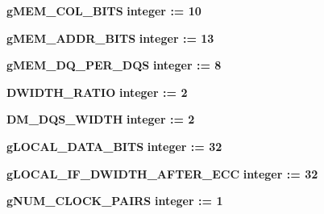 \begin{DoxyCompactItemize}
\item 
{\bf g\+M\+E\+M\+\_\+\+C\+O\+L\+\_\+\+B\+I\+TS} {\bfseries {\bfseries \textcolor{comment}{integer}\textcolor{vhdlchar}{ }\textcolor{vhdlchar}{ }\textcolor{vhdlchar}{\+:}\textcolor{vhdlchar}{=}\textcolor{vhdlchar}{ }\textcolor{vhdlchar}{ } \textcolor{vhdldigit}{10} \textcolor{vhdlchar}{ }}} 
\item 
{\bf g\+M\+E\+M\+\_\+\+A\+D\+D\+R\+\_\+\+B\+I\+TS} {\bfseries {\bfseries \textcolor{comment}{integer}\textcolor{vhdlchar}{ }\textcolor{vhdlchar}{ }\textcolor{vhdlchar}{\+:}\textcolor{vhdlchar}{=}\textcolor{vhdlchar}{ }\textcolor{vhdlchar}{ } \textcolor{vhdldigit}{13} \textcolor{vhdlchar}{ }}} 
\item 
{\bf g\+M\+E\+M\+\_\+\+D\+Q\+\_\+\+P\+E\+R\+\_\+\+D\+QS} {\bfseries {\bfseries \textcolor{comment}{integer}\textcolor{vhdlchar}{ }\textcolor{vhdlchar}{ }\textcolor{vhdlchar}{\+:}\textcolor{vhdlchar}{=}\textcolor{vhdlchar}{ }\textcolor{vhdlchar}{ } \textcolor{vhdldigit}{8} \textcolor{vhdlchar}{ }}} 
\item 
{\bf D\+W\+I\+D\+T\+H\+\_\+\+R\+A\+T\+IO} {\bfseries {\bfseries \textcolor{comment}{integer}\textcolor{vhdlchar}{ }\textcolor{vhdlchar}{ }\textcolor{vhdlchar}{\+:}\textcolor{vhdlchar}{=}\textcolor{vhdlchar}{ }\textcolor{vhdlchar}{ } \textcolor{vhdldigit}{2} \textcolor{vhdlchar}{ }}} 
\item 
{\bf D\+M\+\_\+\+D\+Q\+S\+\_\+\+W\+I\+D\+TH} {\bfseries {\bfseries \textcolor{comment}{integer}\textcolor{vhdlchar}{ }\textcolor{vhdlchar}{ }\textcolor{vhdlchar}{\+:}\textcolor{vhdlchar}{=}\textcolor{vhdlchar}{ }\textcolor{vhdlchar}{ } \textcolor{vhdldigit}{2} \textcolor{vhdlchar}{ }}} 
\item 
{\bf g\+L\+O\+C\+A\+L\+\_\+\+D\+A\+T\+A\+\_\+\+B\+I\+TS} {\bfseries {\bfseries \textcolor{comment}{integer}\textcolor{vhdlchar}{ }\textcolor{vhdlchar}{ }\textcolor{vhdlchar}{\+:}\textcolor{vhdlchar}{=}\textcolor{vhdlchar}{ }\textcolor{vhdlchar}{ } \textcolor{vhdldigit}{32} \textcolor{vhdlchar}{ }}} 
\item 
{\bf g\+L\+O\+C\+A\+L\+\_\+\+I\+F\+\_\+\+D\+W\+I\+D\+T\+H\+\_\+\+A\+F\+T\+E\+R\+\_\+\+E\+CC} {\bfseries {\bfseries \textcolor{comment}{integer}\textcolor{vhdlchar}{ }\textcolor{vhdlchar}{ }\textcolor{vhdlchar}{\+:}\textcolor{vhdlchar}{=}\textcolor{vhdlchar}{ }\textcolor{vhdlchar}{ } \textcolor{vhdldigit}{32} \textcolor{vhdlchar}{ }}} 
\item 
{\bf g\+N\+U\+M\+\_\+\+C\+L\+O\+C\+K\+\_\+\+P\+A\+I\+RS} {\bfseries {\bfseries \textcolor{comment}{integer}\textcolor{vhdlchar}{ }\textcolor{vhdlchar}{ }\textcolor{vhdlchar}{\+:}\textcolor{vhdlchar}{=}\textcolor{vhdlchar}{ }\textcolor{vhdlchar}{ } \textcolor{vhdldigit}{1} \textcolor{vhdlchar}{ }}} 

\end{DoxyCompactItemize}
